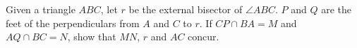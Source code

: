 Given a triangle $ ABC$,  let $ r$ be the external bisector of $ \angle ABC$. $ P$ and $ Q$ are the feet of the perpendiculars from $ A$ and $ C$ to $ r$. If $ CP \cap BA = M$ and $ AQ \cap BC=N$,  show that $ MN$,  $ r$ and $ AC$ concur.